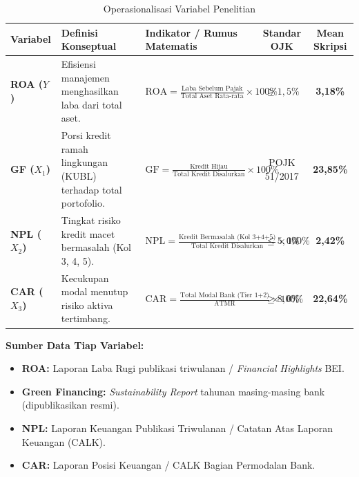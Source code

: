 \documentclass[11pt,a4paper]{article}
\begin{document}
\begin{table}[htbp]
\centering
\small
\renewcommand{\arraystretch}{1.3}
\caption{Operasionalisasi Variabel Penelitian}
\begin{tabularx}{\textwidth}{l p{3.2cm} X c c}
\toprule
\rowcolor{tableHeaderBg}
\textbf{Variabel} & \textbf{Definisi Konseptual} & \textbf{Indikator / Rumus Matematis} & \textbf{Standar OJK} & \textbf{Mean Skripsi} \\
\midrule
\textbf{ROA ($Y$)} & Efisiensi manajemen menghasilkan laba dari total aset. & $\displaystyle \text{ROA} = \frac{\text{Laba Sebelum Pajak}}{\text{Total Aset Rata-rata}} \times 100\%$ & $\ge 1{,}5\%$ & \textbf{3,18\%} \\
\midrule
\textbf{GF ($X_1$)} & Porsi kredit ramah lingkungan (KUBL) terhadap total portofolio. & $\displaystyle \text{GF} = \frac{\text{Kredit Hijau}}{\text{Total Kredit Disalurkan}} \times 100\%$ & POJK 51/2017 & \textbf{23,85\%} \\
\midrule
\textbf{NPL ($X_2$)} & Tingkat risiko kredit macet bermasalah (Kol 3, 4, 5). & $\displaystyle \text{NPL} = \frac{\text{Kredit Bermasalah (Kol 3+4+5)}}{\text{Total Kredit Disalurkan}} \times 100\%$ & $\le 5{,}0\%$ & \textbf{2,42\%} \\
\midrule
\textbf{CAR ($X_3$)} & Kecukupan modal menutup risiko aktiva tertimbang. & $\displaystyle \text{CAR} = \frac{\text{Total Modal Bank (Tier 1+2)}}{\text{ATMR}} \times 100\%$ & $\ge 8{,}0\%$ & \textbf{22,64\%} \\
\bottomrule
\end{tabularx}
\end{table}

\textbf{Sumber Data Tiap Variabel:}
\begin{itemize}
    \item \textbf{ROA:} Laporan Laba Rugi publikasi triwulanan / \textit{Financial Highlights} BEI.
    \item \textbf{Green Financing:} \textit{Sustainability Report} tahunan masing-masing bank (dipublikasikan resmi).
    \item \textbf{NPL:} Laporan Keuangan Publikasi Triwulanan / Catatan Atas Laporan Keuangan (CALK).
    \item \textbf{CAR:} Laporan Posisi Keuangan / CALK Bagian Permodalan Bank.
\end{itemize}

\end{document}
